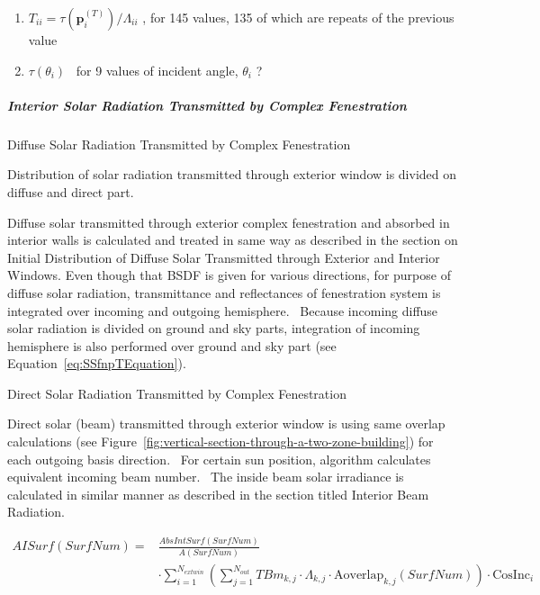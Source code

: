 \begin{enumerate}
\def\labelenumi{(\arabic{enumi})}
\item
  \(T_{ii} = \tau(\mathbf{p}_i^{(T)})/\Lambda_{ii}\) , for 145 values, 135 of which are repeats of the previous value
\item
  \(\tau ({\theta_i})\) ~for 9 values of incident angle, \emph{\(\theta\)\(_{i}\)} ?
\end{enumerate}

\subparagraph{Interior Solar Radiation Transmitted by Complex Fenestration}\label{interior-solar-radiation-transmitted-by-complex-fenestration}

Diffuse Solar Radiation Transmitted by Complex Fenestration

Distribution of solar radiation transmitted through exterior window is divided on diffuse and direct part.

Diffuse solar transmitted through exterior complex fenestration and absorbed in interior walls is calculated and treated in same way as described in the section on Initial Distribution of Diffuse Solar Transmitted through Exterior and Interior Windows. Even though that BSDF is given for various directions, for purpose of diffuse solar radiation, transmittance and reflectances of fenestration system is integrated over incoming and outgoing hemisphere.~ Because incoming diffuse solar radiation is divided on ground and sky parts, integration of incoming hemisphere is also performed over ground and sky part (see Equation~\ref{eq:SSfnpTEquation}).

Direct Solar Radiation Transmitted by Complex Fenestration

Direct solar (beam) transmitted through exterior window is using same overlap calculations (see Figure~\ref{fig:vertical-section-through-a-two-zone-building}) for each outgoing basis direction.~ For certain sun position, algorithm calculates equivalent incoming beam number.~ The inside beam solar irradiance is calculated in similar manner as described in the section titled Interior Beam Radiation.

\begin{equation}
\begin{split}
AISurf\left(SurfNum\right) =& \frac{AbsIntSurf\left(SurfNum\right)}{A\left(SurfNum\right)} \\
&\cdot\sum_{i = 1}^{N_{extwin}} \left( \sum_{j = 1}^{N_{out}} TB{m_{k,j}} \cdot \Lambda_{k,j} \cdot \text{Aoverlap}_{k,j} \left( SurfNum \right)\right) \cdot \text{CosInc}_i
\end{split}
\label{eq:AISurfEquation}
\end{equation}

